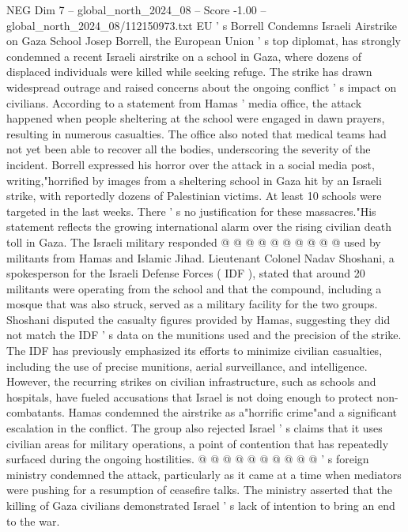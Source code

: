 \begin{textsample}{NEG Dim 7 – global\_north\_2024\_08 – Score -1.00 – global\_north\_2024\_08/112150973.txt}  \label{ex:f7_neg_441}
EU ' s Borrell Condemns Israeli Airstrike on Gaza School Josep Borrell, the European Union ' s top diplomat, has strongly condemned a recent Israeli airstrike on a school in Gaza, where dozens of displaced individuals were killed while seeking refuge.
The strike has drawn widespread outrage and raised concerns about the ongoing conflict ' s impact on civilians.
According to a statement from Hamas ' media office, the attack happened when people sheltering at the school were engaged in dawn prayers, resulting in numerous casualties.
The office also noted that medical teams had not yet been able to recover all the bodies, underscoring the severity of the incident.
Borrell expressed his horror over the attack in a social media post, writing,"horrified by images from a sheltering school in Gaza hit by an Israeli strike, with reportedly dozens of Palestinian victims.
At least 10 schools were targeted in the last weeks.
There ' s no justification for these massacres."His statement reflects the growing international alarm over the rising civilian death toll in Gaza.
The Israeli military responded @ @ @ @ @ @ @ @ @ @ used by militants from Hamas and Islamic Jihad.
Lieutenant Colonel Nadav Shoshani, a spokesperson for the Israeli Defense Forces ( IDF ), stated that around 20 militants were operating from the school and that the compound, including a mosque that was also struck, served as a military facility for the two groups.
Shoshani disputed the casualty figures provided by Hamas, suggesting they did not match the IDF ' s data on the munitions used and the precision of the strike.
The IDF has previously emphasized its efforts to minimize civilian casualties, including the use of precise munitions, aerial surveillance, and intelligence.
However, the recurring strikes on civilian infrastructure, such as schools and hospitals, have fueled accusations that Israel is not doing enough to protect non-combatants.
Hamas condemned the airstrike as a"horrific crime"and a significant escalation in the conflict.
The group also rejected Israel ' s claims that it uses civilian areas for military operations, a point of contention that has repeatedly surfaced during the ongoing hostilities. @ @ @ @ @ @ @ @ @ @ ' s foreign ministry condemned the attack, particularly as it came at a time when mediators were pushing for a resumption of ceasefire talks.
The ministry asserted that the killing of Gaza civilians demonstrated Israel ' s lack of intention to bring an end to the war.

\end{textsample}
